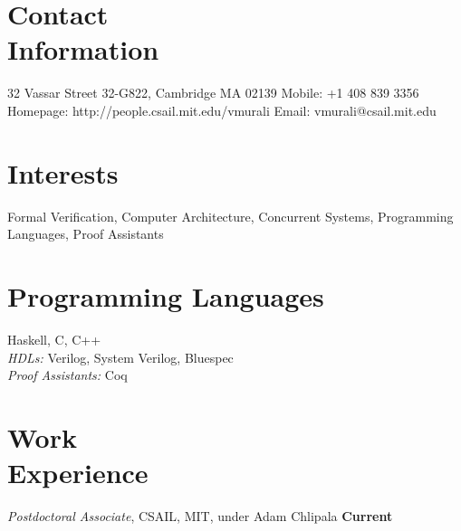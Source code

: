 \documentclass[margin,line]{resume}
\begin{document}
\begin{resume}

    \section{\mysidestyle Contact\\Information}

    32 Vassar Street 32-G822, Cambridge MA 02139   \hfill Mobile: +1 408 839 3356          \\
    Homepage: http://people.csail.mit.edu/vmurali     \hfill Email: vmurali@csail.mit.edu    \\

    \vspace{-5mm}
    \section{\mysidestyle Interests}

    Formal Verification, Computer Architecture, Concurrent Systems, Programming Languages, Proof Assistants\\

    \vspace{-5mm}

    \section{\mysidestyle Programming Languages}
    Haskell, C, C++\\
    \emph{HDLs:} Verilog, System Verilog, Bluespec\\
    \emph{Proof Assistants:} Coq\\

    \vspace{-5mm}
    \section{\mysidestyle Work\\Experience}
   
    \textit{Postdoctoral Associate}, CSAIL, MIT, under Adam Chlipala \hfill \textbf{Current}\\


\end{resume}
\end{document}
